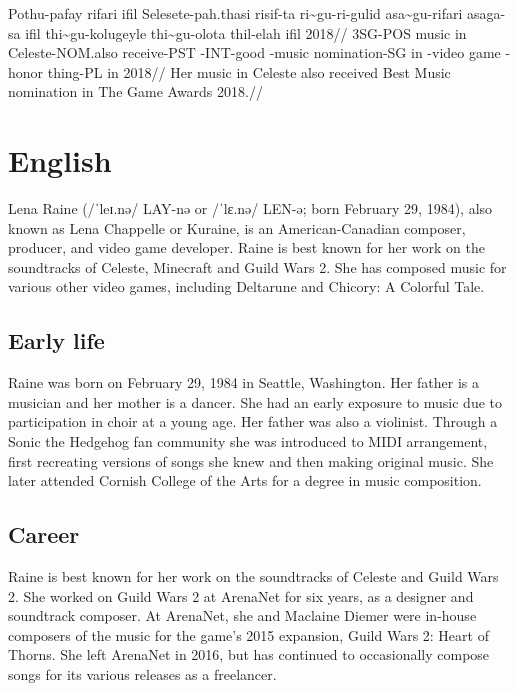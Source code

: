 \ex
\begingl
\gla  Pothu-pafay rifari ifil Selesete-pah.thasi risif-ta ri\~{}gu-ri-gulid asa\~{}gu-rifari asaga-sa ifil  thi\~{}gu-kolugeyle thi\~{}gu-olota thil-elah ifil 2018//
\glb  3SG-POS music in Celeste-NOM.also receive-PST \agradj-INT-good \agradj-music nomination-SG in  \agradj-video game \agradj-honor thing-PL in 2018//
\glft Her music in Celeste also received Best Music nomination in The Game Awards 2018.//
\endgl
\xe

\newpage

\section{English}
Lena Raine (/ˈleɪ.nə/ LAY-nə or /ˈlɛ.nə/ LEN-ə; born February 29, 1984), also known as Lena Chappelle or Kuraine, is an American-Canadian composer, producer, and video game developer.
Raine is best known for her work on the soundtracks of Celeste, Minecraft and Guild Wars 2.
She has composed music for various other video games, including Deltarune and Chicory: A Colorful Tale.

\subsection{Early life}

Raine was born on February 29, 1984 in Seattle, Washington.
Her father is a musician and her mother is a dancer.
She had an early exposure to music due to participation in choir at a young age.
Her father was also a violinist.
Through a Sonic the Hedgehog fan community she was introduced to MIDI arrangement, first recreating versions of songs she knew and then making original music.
She later attended Cornish College of the Arts for a degree in music composition.

\subsection{Career}

Raine is best known for her work on the soundtracks of Celeste and Guild Wars 2.
She worked on Guild Wars 2 at ArenaNet for six years, as a designer and soundtrack composer.
At ArenaNet, she and Maclaine Diemer were in-house composers of the music for the game's 2015 expansion, Guild Wars 2: Heart of Thorns.
She left ArenaNet in 2016, but has continued to occasionally compose songs for its various releases as a freelancer.

